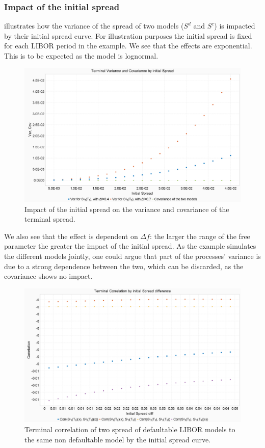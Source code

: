 \documentclass[12pt]{article}
\begin{document}
	\subsubsection{Impact of the initial spread}
	 illustrates how the variance of the spread of two models ($S^d$ and $S^c$) is impacted by their initial spread curve. For illustration purposes the initial spread is fixed for each LIBOR period in the example. We see that the effects are exponential. This is to be expected as the model is lognormal.
	\begin{figure}[h!]
		\centering
		\includegraphics[width=0.7\linewidth]{figures/Today/SpreadVarCovByInitSpread}
		\caption{Impact of the initial spread on the variance and covariance of the terminal spread.}
		\label{fig:spreadvarcovbyinitspread}
	\end{figure}
	We also see that the effect is dependent on $\Delta f$: the larger the range of the free parameter the greater the impact of the initial spread. As the example simulates the different models jointly, one could argue that part of the processes' variance is due to a strong dependence between the two, which can be discarded, as the covariance shows no impact.
	\begin{figure}[h!]
		\centering
		\includegraphics[width=0.7\linewidth]{figures/Today/SpreadCorrelationByInitSpread}
		\caption{Terminal correlation of two spread of defaultable LIBOR models to the same non defaultable model by the initial spread curve.}
		\label{fig:spreadcorrelationbyinitspread}
	\end{figure}%
\end{document}
